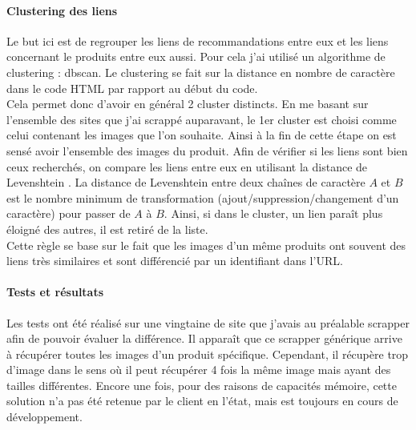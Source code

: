 \documentclass{article} %
\begin{document}
\paragraph{Clustering des liens\\}
Le but ici est de regrouper les liens de recommandations entre eux et les liens concernant le produits entre eux aussi. Pour cela j'ai utilisé un algorithme de clustering : dbscan. Le clustering se fait sur la distance en nombre de caractère dans le code HTML par rapport au début du code.\\
Cela permet donc d'avoir en général 2 cluster distincts. En me basant sur l'ensemble des sites que j'ai scrappé auparavant, le 1er cluster est choisi comme celui contenant les images que l'on souhaite. Ainsi à la fin de cette étape on est sensé avoir l'ensemble des images du produit. Afin de vérifier si les liens sont bien ceux recherchés, on compare les liens entre eux en utilisant la distance de Levenshtein \cite{levenshtein}. La distance de Levenshtein entre deux chaînes de caractère $A$ et $B$ est le nombre minimum de transformation (ajout/suppression/changement d'un caractère) pour passer de $A$ à $B$. Ainsi, si dans le cluster, un lien paraît plus éloigné des autres, il est retiré de la liste.\\
Cette règle se base sur le fait que les images d'un même produits ont souvent des liens très similaires et sont différencié par un identifiant dans l'URL. 

\paragraph{Tests et résultats\\}
Les tests ont été réalisé sur une vingtaine de site que j'avais au préalable scrapper afin de pouvoir évaluer la différence. Il apparaît que ce scrapper générique arrive à récupérer toutes les images d'un produit spécifique. Cependant, il récupère trop d'image dans le sens où il peut récupérer 4 fois la même image mais ayant des tailles différentes. Encore une fois, pour des raisons de capacités mémoire, cette solution n'a pas été retenue par le client en l'état, mais est toujours en cours de développement.
\end{document}
